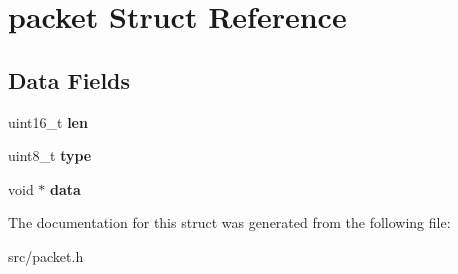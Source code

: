 \hypertarget{structpacket}{}\section{packet Struct Reference}
\label{structpacket}
\subsection*{Data Fields}
\begin{DoxyCompactItemize}
\item 
\hypertarget{structpacket_a7b613bc0cf0d706a0c825dadfc6840d2}{}uint16\+\_\+t {\bfseries len}\label{structpacket_a7b613bc0cf0d706a0c825dadfc6840d2}

\item 
\hypertarget{structpacket_a53b4fdec86403ff886583182dfae176e}{}uint8\+\_\+t {\bfseries type}\label{structpacket_a53b4fdec86403ff886583182dfae176e}

\item 
\hypertarget{structpacket_ad3115ffc58cc55bae08635ed965c4768}{}void $\ast$ {\bfseries data}\label{structpacket_ad3115ffc58cc55bae08635ed965c4768}

\end{DoxyCompactItemize}


The documentation for this struct was generated from the following file\+:\begin{DoxyCompactItemize}
\item 
src/packet.\+h\end{DoxyCompactItemize}

